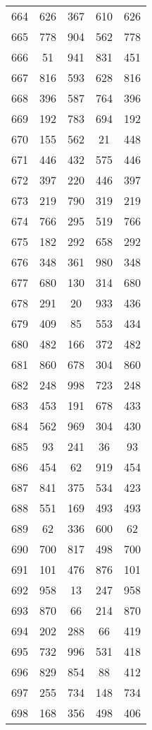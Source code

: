 \documentclass[a4paper,10pt,ngerman]{scrartcl}
\begin{document}
\begin{longtable}[c]{c|c|c|c|c}
    664 & 626 & 367 & 610 & 626 \\
    665 & 778 & 904 & 562 & 778 \\
    666 & 51 & 941 & 831 & 451 \\
    667 & 816 & 593 & 628 & 816 \\
    668 & 396 & 587 & 764 & 396 \\
    669 & 192 & 783 & 694 & 192 \\
    670 & 155 & 562 & 21 & 448 \\
    671 & 446 & 432 & 575 & 446 \\
    672 & 397 & 220 & 446 & 397 \\
    673 & 219 & 790 & 319 & 219 \\
    674 & 766 & 295 & 519 & 766 \\
    675 & 182 & 292 & 658 & 292 \\
    676 & 348 & 361 & 980 & 348 \\
    677 & 680 & 130 & 314 & 680 \\
    678 & 291 & 20 & 933 & 436 \\
    679 & 409 & 85 & 553 & 434 \\
    680 & 482 & 166 & 372 & 482 \\
    681 & 860 & 678 & 304 & 860 \\
    682 & 248 & 998 & 723 & 248 \\
    683 & 453 & 191 & 678 & 433 \\
    684 & 562 & 969 & 304 & 430 \\
    685 & 93 & 241 & 36 & 93 \\
    686 & 454 & 62 & 919 & 454 \\
    687 & 841 & 375 & 534 & 423 \\
    688 & 551 & 169 & 493 & 493 \\
    689 & 62 & 336 & 600 & 62 \\
    690 & 700 & 817 & 498 & 700 \\
    691 & 101 & 476 & 876 & 101 \\
    692 & 958 & 13 & 247 & 958 \\
    693 & 870 & 66 & 214 & 870 \\
    694 & 202 & 288 & 66 & 419 \\
    695 & 732 & 996 & 531 & 418 \\
    696 & 829 & 854 & 88 & 412 \\
    697 & 255 & 734 & 148 & 734 \\
    698 & 168 & 356 & 498 & 406 \\

\end{longtable}
\end{document}
